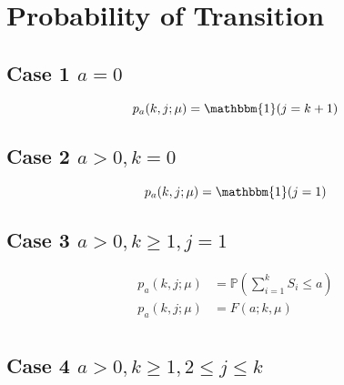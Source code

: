 \documentclass{article}
\begin{document}
\section{Probability of Transition}

\subsection{Case 1 $a = 0$}

\begin{equation*}
	p_{a} (k, j; \mu) = \mathbbm{1} (j = k + 1) \\
\end{equation*}

\subsection{Case 2 $a > 0, k = 0$}

\begin{equation*}
	p_{a} (k, j; \mu) = \mathbbm{1} (j = 1) \\
\end{equation*}

\subsection{Case 3 $a > 0, k \geq 1, j = 1$}

\begin{align*}
	p_{a} (k, j; \mu) & = \mathbb{P} \left( \sum_{i = 1}^{k} S_{i} \leq a \right) \\
	p_{a} (k, j; \mu) & = F (a; k, \mu) \\
\end{align*}

\subsection{Case 4 $a > 0, k \geq 1, 2 \leq j \leq k$}
\end{document}
